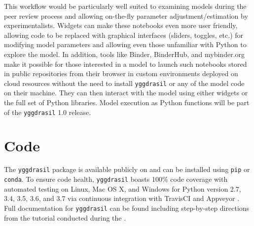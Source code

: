 \documentclass[journal]{IEEEtran}
\newcommand{\todo}[1]{{\color{red}{#1}}}
\newcommand{\pkg}{{\tt yggdrasil}{}}
\newcommand{\hrefgit}[1]{\href{https://github.com/cropsinsilico/yggdrasil}{\todo{#1}}}
\newcommand{\hrefdoc}[1]{\href{https://cropsinsilico.github.io/yggdrasil/}{\todo{#1}}}
\newcommand{\hrefhack}[1]{\href{https://cropsinsilico.github.io/yggdrasil/hackathon2018/index.html}{\todo{#1}}}
\begin{document}
This workflow would be particularly well suited to examining models during the peer review process and allowing on-the-fly parameter adjustment/estimation by experimentalists. Widgets can make these notebooks even more user friendly, allowing code to be replaced with graphical interfaces (sliders, toggles, etc.) for modifying model parameters and allowing even those unfamiliar with Python to explore the model. In addition, tools like Binder, BinderHub, and mybinder.org \citep{Jupyter2018} make it possible for those interested in a model to launch such notebooks stored in public repositories from their browser in custom environments deployed on cloud resources without the need to install {\pkg} or any of the model code on their machine. They can then interact with the model using either widgets or the full set of Python libraries.
%
Model execution as Python functions will be part of the {\pkg} 1.0 release.

\section*{Code}\label{S:code}
The {\pkg} package is available publicly on \hrefgit{Github} and can be 
installed using {\tt pip} or {\tt conda}. To ensure code health, {\pkg} boasts 100\% code coverage with automated testing on Linux, Mac OS X, and Windows for Python version 2.7, 3.4, 3.5, 3.6, and 3.7 via continuous integration with TravisCI \citep{travisci} and Appveyor \citep{appveyor}. Full documentation for {\pkg} can be found \hrefdoc{here} including step-by-step directions from the tutorial conducted during the \hrefhack{2018 Crops in Silico Hackathon}. 


\end{document}
